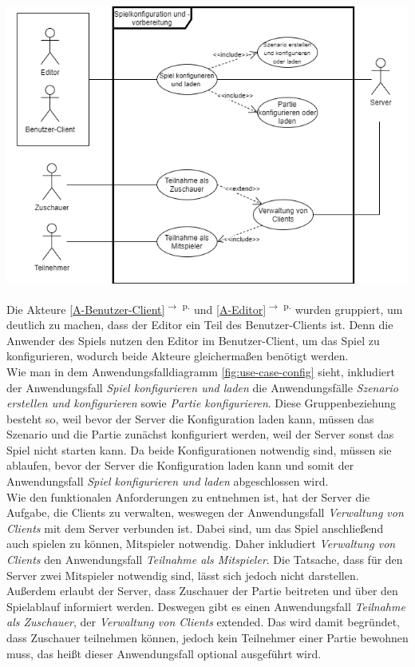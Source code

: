 \documentclass[12pt]{article}
\newcounter{fa}
\newcommand{\rref}[1]{\ref{#1}\textsuperscript{$\rightarrow$ p. \pageref{#1}}}
\begin{document}
\centering
\includegraphics[width=\textwidth]{images/Anwendungsfalldiagramm_Konfiguration}
\label{fig:use-case-config}
\flushleft

\vspace{2cm}

Die Akteure \rref{A-Benutzer-Client} und \rref{A-Editor} wurden gruppiert, um deutlich zu machen, dass der Editor ein Teil des Benutzer-Clients ist. Denn die Anwender des Spiels nutzen den Editor im Benutzer-Client, um das Spiel zu konfigurieren, wodurch beide Akteure gleichermaßen benötigt werden. \\ Wie man in dem Anwendungsfalldiagramm \autoref{fig:use-case-config} sieht, inkludiert der Anwendungsfall \textit{Spiel konfigurieren und laden} die Anwendungsfälle \textit{Szenario erstellen und konfigurieren} sowie \textit{Partie konfigurieren}. Diese Gruppenbeziehung besteht so, weil bevor der Server die Konfiguration laden kann, müssen das Szenario und die Partie zunächst konfiguriert werden, weil der Server sonst das Spiel nicht starten kann. Da beide Konfigurationen notwendig sind, müssen sie ablaufen, bevor der Server die Konfiguration laden kann und somit der Anwendungsfall \textit{Spiel konfigurieren und laden} abgeschlossen wird. \\ Wie den funktionalen Anforderungen zu entnehmen ist, hat der Server die Aufgabe, die Clients zu verwalten, weswegen der Anwendungsfall \textit{Verwaltung von Clients} mit dem Server verbunden ist. Dabei sind, um das Spiel anschließend auch spielen zu können, Mitspieler notwendig. Daher inkludiert \textit{Verwaltung von Clients} den Anwendungsfall \textit{Teilnahme als Mitspieler}. Die Tatsache, dass für den Server zwei Mitspieler notwendig sind, lässt sich jedoch nicht darstellen. Außerdem erlaubt der Server, dass Zuschauer der Partie beitreten und über den Spielablauf informiert werden. Deswegen gibt es einen Anwendungsfall \textit{Teilnahme als Zuschauer}, der \textit{Verwaltung von Clients} extended. Das wird damit begründet, dass Zuschauer teilnehmen können, jedoch kein Teilnehmer einer Partie bewohnen muss, das heißt dieser Anwendungsfall optional ausgeführt wird. 
\end{document}
